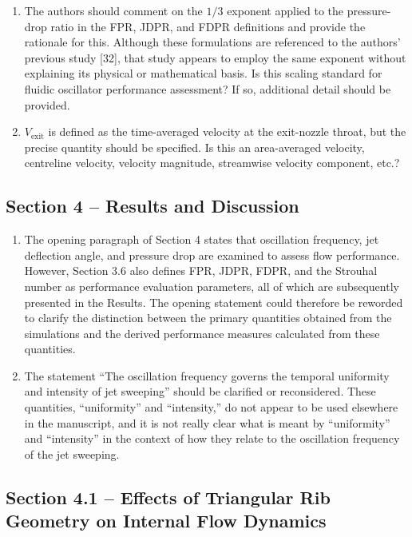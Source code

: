 \documentclass[11pt]{article}
\begin{document}
\begin{enumerate}
		\item The authors should comment on the $1/3$ exponent applied to the pressure-drop ratio in the FPR, JDPR, and FDPR definitions and provide the rationale for this. Although these formulations are referenced to the authors' previous study [32], that study appears to employ the same exponent without explaining its physical or mathematical basis. Is this scaling standard for fluidic oscillator performance assessment? If so, additional detail should be provided.
		
		\item $V_{\mathrm{exit}}$ is defined as the time-averaged velocity at the exit-nozzle throat, but the precise quantity should be specified. Is this an area-averaged velocity, centreline velocity, velocity magnitude, streamwise velocity component, etc.?
	\end{enumerate}
	
	\subsection*{Section 4 -- Results and Discussion}
	\begin{enumerate}
		\item The opening paragraph of Section 4 states that oscillation frequency, jet deflection angle, and pressure drop are examined to assess flow performance. However, Section 3.6 also defines FPR, JDPR, FDPR, and the Strouhal number as performance evaluation parameters, all of which are subsequently presented in the Results. The opening statement could therefore be reworded to clarify the distinction between the primary quantities obtained from the simulations and the derived performance measures calculated from these quantities.
		\item The statement ``The oscillation frequency governs the temporal uniformity and intensity of jet sweeping'' should be clarified or reconsidered. These quantities, ``uniformity'' and ``intensity,'' do not appear to be used elsewhere in the manuscript, and it is not really clear what is meant by ``uniformity'' and ``intensity'' in the context of how they relate to the oscillation frequency of the jet sweeping.
	\end{enumerate}
	
	\subsection*{Section 4.1 -- Effects of Triangular Rib Geometry on Internal Flow Dynamics}
	
\end{document}
